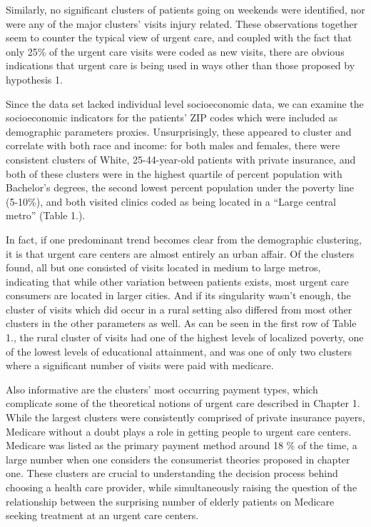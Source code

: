 \documentclass[12pt,twoside]{reedthesis}
\begin{document}
  Similarly, no significant clusters of patients going on weekends were
  identified, nor were any of the major clusters' visits injury related.
  These observations together seem to counter the typical view of urgent
  care, and coupled with the fact that only 25\% of the urgent care visits
  were coded as new visits, there are obvious indications that urgent care
  is being used in ways other than those proposed by hypothesis 1.
  
  Since the data set lacked individual level socioeconomic data, we can
  examine the socioeconomic indicators for the patients' ZIP codes which
  were included as demographic parameters proxies. Unsurprisingly, these
  appeared to cluster and correlate with both race and income: for both
  males and females, there were consistent clusters of White,
  25-44-year-old patients with private insurance, and both of these
  clusters were in the highest quartile of percent population with
  Bachelor's degrees, the second lowest percent population under the
  poverty line (5-10\%), and both visited clinics coded as being located
  in a ``Large central metro'' (Table 1.).
  
  In fact, if one predominant trend becomes clear from the demographic
  clustering, it is that urgent care centers are almost entirely an urban
  affair. Of the clusters found, all but one consisted of visits located
  in medium to large metros, indicating that while other variation between
  patients exists, most urgent care consumers are located in larger
  cities. And if its singularity wasn't enough, the cluster of visits
  which did occur in a rural setting also differed from most other
  clusters in the other parameters as well. As can be seen in the first
  row of Table 1., the rural cluster of visits had one of the highest
  levels of localized poverty, one of the lowest levels of educational
  attainment, and was one of only two clusters where a significant number
  of visits were paid with medicare.
  
  Also informative are the clusters' most occurring payment types, which
  complicate some of the theoretical notions of urgent care described in
  Chapter 1. While the largest clusters were consistently comprised of
  private insurance payers, Medicare without a doubt plays a role in
  getting people to urgent care centers. Medicare was listed as the
  primary payment method around 18 \% of the time, a large number when one
  considers the consumerist theories proposed in chapter one. These
  clusters are crucial to understanding the decision process behind
  choosing a health care provider, while simultaneously raising the
  question of the relationship between the surprising number of elderly
  patients on Medicare seeking treatment at an urgent care centers.
  
\end{document}
